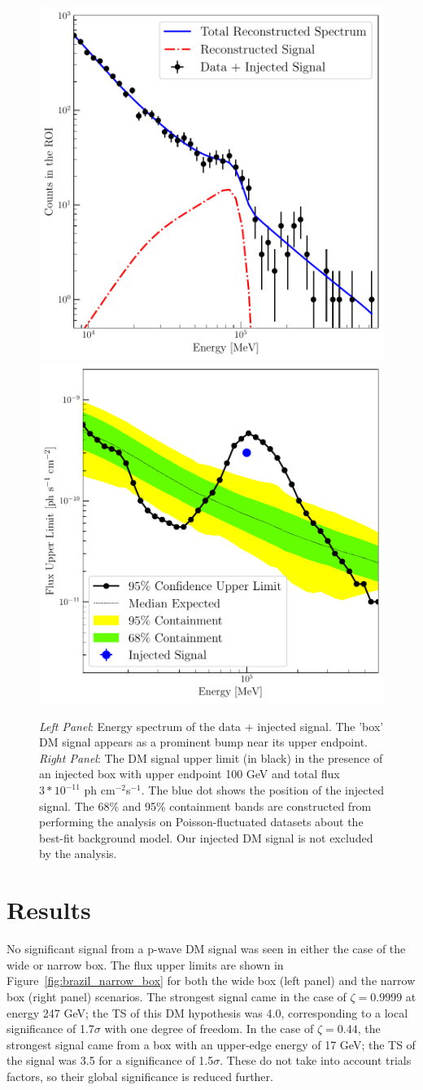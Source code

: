 \begin{figure}[ht]
\begin{center}
\includegraphics[width=0.45\columnwidth]{./figures/good_box_fit.pdf}
\includegraphics[width=0.45\columnwidth]{./figures/brazil_artificial_box.pdf}
\noindent
\caption{
\label{fig:artificial_box}
{\it Left Panel}: Energy spectrum of the data + injected signal. The 'box' DM signal appears as a prominent bump near its upper endpoint. 
{\it Right Panel}: The DM signal upper limit (in black) in the presence of an injected box with upper endpoint 100 GeV and total flux $3*10^{-11} $ ph cm$^{-2} $s$^{-1}$. The blue dot shows the position of the injected signal.
The 68\% and 95\% containment bands are constructed from performing the analysis on Poisson-fluctuated datasets about the best-fit background model. 
Our injected DM signal is not excluded by the analysis. 
}
\end{center}
\end{figure}


\section{Results}\label{sec:results}

No significant signal from a p-wave DM signal was seen in either the case of the wide or narrow box.
The flux upper limits are shown in Figure~\ref{fig:brazil_narrow_box} for both the wide box (left panel) and the narrow box (right panel) scenarios. 
The strongest signal came in the case of $\zeta = 0.9999$ at energy 247 GeV; the TS of this DM hypothesis was 4.0, corresponding to a local significance of 1.7$\sigma$ with one degree of freedom.
In the case of $\zeta = 0.44$, the strongest signal came from a box with an upper-edge energy of 17 GeV; the TS of the signal was 3.5 for a significance of 1.5$\sigma$.
These do not take into account trials factors, so their global significance is reduced further.

